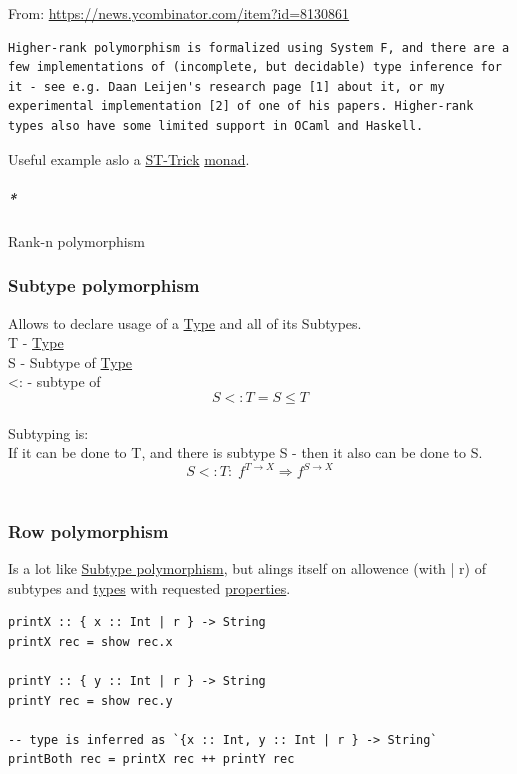 \documentclass[11pt]{article}
\begin{document}
From: \url{https://news.ycombinator.com/item?id=8130861}\\
\begin{verbatim}
Higher-rank polymorphism is formalized using System F, and there are a few implementations of (incomplete, but decidable) type inference for it - see e.g. Daan Leijen's research page [1] about it, or my experimental implementation [2] of one of his papers. Higher-rank types also have some limited support in OCaml and Haskell.
\end{verbatim}

Useful example aslo a \hyperref[org61f073d]{ST-Trick} \hyperref[org86a5d95]{monad}.\\

\subparagraph{\emph{*}}
\label{sec:org75ef05b}

\label{orgfc4f8b1}Rank-n polymorphism\\

\subsubsection{\label{orgbc794e6}Subtype polymorphism}
\label{sec:org47df7bd}
Allows to declare usage of a \hyperref[orgc4aea2f]{Type} and all of its Subtypes.\\
T - \hyperref[orgc4aea2f]{Type}\\
S - Subtype of \hyperref[orgc4aea2f]{Type}\\
<: - subtype of\\
$$ S <: T = S \le T $$\\

Subtyping is:\\
If it can be done to T, and there is subtype S - then it also can be done to S.\\
$$ S <:T : \; f^{T \to X} \Rightarrow f^{S \to X} $$\\

\subsubsection{\label{orgaa0d290}Row polymorphism}
\label{sec:org76604d5}
Is a lot like \hyperref[orgbc794e6]{Subtype polymorphism}, but alings itself on allowence (with | r) of subtypes and \hyperref[org4209edd]{types} with requested \hyperref[org85fb3a1]{properties}.\\
\begin{verbatim}
printX :: { x :: Int | r } -> String
printX rec = show rec.x

printY :: { y :: Int | r } -> String
printY rec = show rec.y

-- type is inferred as `{x :: Int, y :: Int | r } -> String`
printBoth rec = printX rec ++ printY rec
\end{verbatim}
\end{document}
